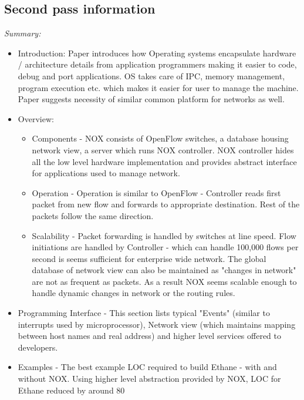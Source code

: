 \documentclass[letterpaper,twocolumn,10pt]{article}
\begin{document}
\subsection{Second pass information}
\label{sec:second}



{\it Summary:} 

\begin{itemize}

\item Introduction: Paper introduces how Operating systems encapsulate hardware / architecture details from application programmers making it easier to code, debug and port applications. OS takes care of IPC, memory management, program execution etc. which makes it easier for user to manage the machine. Paper suggests necessity of similar common platform for networks as well.

\item Overview: 
\begin{itemize}
\item Components - NOX consists of OpenFlow switches, a database housing network view, a server which runs NOX controller. NOX controller hides all the low level hardware implementation and provides abstract interface for applications used to manage network.
\item Operation - Operation is similar to OpenFlow - Controller reads first packet from new flow and forwards to appropriate destination. Rest of the packets follow the same direction.
\item Scalability - Packet forwarding is handled by switches at line speed. Flow initiations are handled by Controller - which can handle 100,000 flows per second is seems sufficient for enterprise wide network. The global database  of network view can also be maintained as "changes in network" are not as frequent as packets. As a result NOX seems scalable enough to handle dynamic changes in network or the routing rules.
\end{itemize}

\item Programming Interface - This section lists typical "Events" (similar to interrupts used by microprocessor), Network view (which maintains mapping between host names and real address) and higher level services offered to developers.

\item Examples - The best example LOC required to build Ethane - with and without NOX. Using higher level abstraction provided by NOX, LOC for Ethane\cite{Ethane} reduced by around 80%

\end{itemize}
\end{document}
